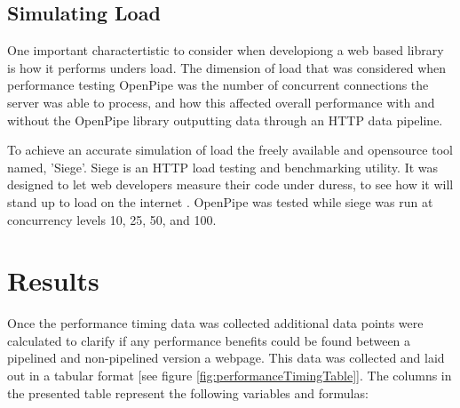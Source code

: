 \documentclass[12pt]{report}
\begin{document}
\section{Simulating Load}

One important charactertistic to consider when developiong a web based library is how it performs unders load. The dimension of load that was considered when performance testing OpenPipe was the number of concurrent connections the server was able to process, and how this affected overall performance with and without the OpenPipe library outputting data through an HTTP data pipeline.

To achieve an accurate simulation of load the freely available and opensource tool named, 'Siege'. Siege is an HTTP load testing and benchmarking utility. It was designed to let web developers measure their code under duress, to see how it will stand up to load on the internet \cite{siegeHomepage}. OpenPipe was tested while siege was run at concurrency levels 10, 25, 50, and 100. 
 

\chapter{Results}

Once the performance timing data was collected additional data points were calculated to clarify if any performance benefits could be found between a pipelined and non-pipelined version a webpage. This data was collected and laid out in a tabular format [see figure \ref{fig:performanceTimingTable}]. The columns in the presented table represent the following variables and formulas:
\end{document}
